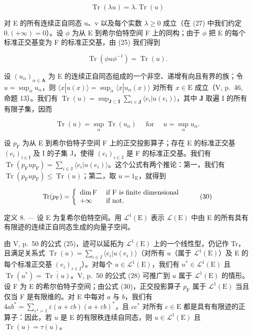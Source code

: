\[
\operatorname{Tr} (\lambda u) = \lambda . \operatorname{Tr} (u)\tag{27}
\]

对 E 的所有连续正自同态 u、v 以及每个实数 \(\lambda \geqslant 0\) 成立（在 (27) 中我们约定 \(0. (+\infty) = 0\)）。设 \(\phi\) 为从 E 到希尔伯特空间 F 上的同构；由于 \(\phi\) 把 E 的每个标准正交基变为 F 的标准正交基，由 (25) 我们得到

\[
\operatorname{Tr} \left(\phi u \phi^ {- 1}\right) = \operatorname{Tr} (u).\tag{28}
\]

设 \((u_{\alpha})_{\alpha \in \mathbf{A}}\) 为 E 的连续正自同态组成的一个非空、递增有向且有界的族；令 \(u = \sup_{\alpha} u_{\alpha}\)，则 \(\langle x|u(x) \rangle = \sup_{\alpha} \langle x|u_{\alpha}(x) \rangle\) 对所有 \(x \in \mathrm{E}\) 成立（V, p.~46, 命题 13）。我们有 \(\operatorname{Tr}(u) = \sup_{\mathbf{J} \subset \mathbf{I}} \sum_{i \in \mathbf{J}} \langle e_i | u(e_i) \rangle\)，其中 \(\mathbf{J}\) 取遍 I 的所有有限子集，因而

\[
\operatorname{Tr} (u) = \sup _ {\alpha} \operatorname{Tr} (u _ {\alpha}) \quad \text { for } \quad u = \sup _ {\alpha} u _ {\alpha}.\tag{29}
\]

设 \(p_{\mathrm{F}}\) 为从 E 到希尔伯特子空间 F 上的正交投影算子；存在 E 的标准正交基 \((e_i)_{i \in \mathrm{I}}\) 及 I 的子集 J，使得 \((e_i)_{i \in \mathrm{J}}\) 是 F 的标准正交基。我们有 \(\operatorname{Tr}(p_{\mathrm{F}} up_{\mathrm{F}}) = \sum_{i \in \mathrm{J}} \langle e_i | u(e_i) \rangle\)。这个公式有两个推论：第一，我们有 \(\operatorname{Tr}(p_{\mathrm{F}} up_{\mathrm{F}}) \leqslant \operatorname{Tr}(u)\)；第二，取 \(u = 1_{\mathrm{E}}\)，就得到

\[
\operatorname{Tr} (p _ {\mathrm{F}}) = \left\{ \begin{array}{l l} \dim \mathrm{F} & \text { if   F   is   finite   dimensional } \\ + \infty & \text { if   not. } \end{array} \right.\tag{30}
\]

定义 8. --- 设 E 为复希尔伯特空间。用 \(\mathcal{L}^{1}(\mathrm{E})\) 表示 \(\mathcal{L}(\mathrm{E})\) 中由 E 的所有具有有限迹的连续正自同态生成的向量子空间。

由 V, p.~50 的公式 (25)，迹可以延拓为 \(\mathcal{L}^1 (\mathrm{E})\) 上的一个线性型，仍记作 Tr，且满足关系式 \(\operatorname{Tr}(u) = \sum_{i\in I}\langle e_i|u(e_i)\rangle\)（对所有 \(u\)（属于 \(\mathcal{L}^1 (\mathrm{E})\)）及 E 的每个标准正交基 \((e_i)_{i\in I}\)）。对每个 \(u\in \mathcal{L}^1 (\mathrm{E})\)，我们有 \(u^{*}\in \mathcal{L}^{1}(\mathrm{E})\) 且 \(\operatorname {Tr}(u^{*}) = \overline{\operatorname{Tr}(u)}\)。V, p.~50 的公式 (28) 可推广到 \(u\) 属于 \(\mathcal{L}^1 (\mathrm{E})\) 的情形。设 F 为 E 的希尔伯特子空间；由公式 (30)，正交投影算子 \(p_{\mathrm{F}}\) 属于 \(\mathcal{L}^1 (\mathrm{E})\) 当且仅当 F 是有限维的。对 E 中每对 \(a\) 与 \(b\)，我们有 \(4ab^{*} = \sum_{\varepsilon^{4} = 1}\varepsilon (a + \varepsilon b)(a + \varepsilon b)^{*}\)，且 \(cc^{*}\) 对所有 \(c\in \mathrm{E}\) 都是具有有限迹的正算子：因此，若 \(u\) 是 E 的有限秩连续自同态，则 \(u \in \mathcal{L}^1(\mathrm{E})\) 且 \(\operatorname{Tr}(u) = \tau(u)\)。


